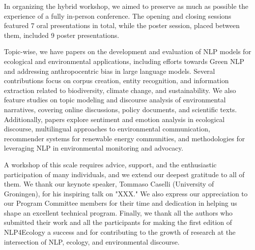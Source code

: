 In organizing the hybrid workshop, we aimed to preserve as much as possible the experience of a fully in-person conference. The opening and closing sessions featured 7 oral presentations in total, while the poster session, placed between them, included 9 poster presentations.

Topic-wise, we have papers on the development and evaluation of NLP models for ecological and environmental applications, including efforts towards Green NLP and addressing anthropocentric bias in large language models. Several contributions focus on corpus creation, entity recognition, and information extraction related to biodiversity, climate change, and sustainability. We also feature studies on topic modeling and discourse analysis of environmental narratives, covering online discussions, policy documents, and scientific texts. Additionally, papers explore sentiment and emotion analysis in ecological discourse, multilingual approaches to environmental communication, recommender systems for renewable energy communities, and methodologies for leveraging NLP in environmental monitoring and advocacy.

A workshop of this scale requires advice, support, and the enthusiastic participation of many individuals, and we extend our deepest gratitude to all of them. We thank our keynote speaker, Tommaso Caselli (University of Groningen), for his inspiring talk on "XXX." We also express our appreciation to our Program Committee members for their time and dedication in helping us shape an excellent technical program. Finally, we thank all the authors who submitted their work and all the participants for making the first edition of NLP4Ecology a success and for contributing to the growth of research at the intersection of NLP, ecology, and environmental discourse.
